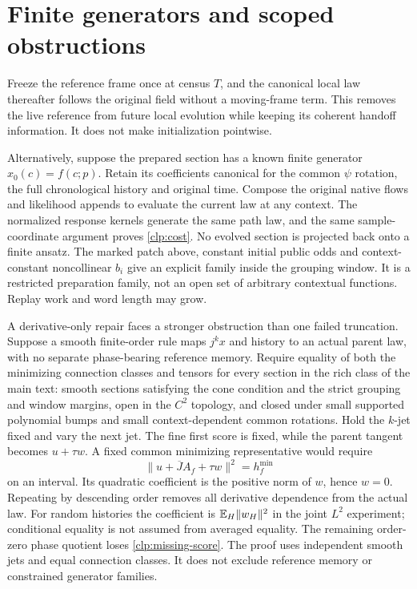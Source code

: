 \section{Finite generators and scoped obstructions}

Freeze the reference frame once at census $T$, and the canonical local law thereafter follows the original field without a moving-frame term. This removes the live reference from future local evolution while keeping its coherent handoff information. It does not make initialization pointwise.

Alternatively, suppose the prepared section has a known finite generator $x_0(c)=f(c;p)$. Retain its coefficients canonical for the common $\psi$ rotation, the full chronological history and original time. Compose the original native flows and likelihood appends to evaluate the current law at any context. The normalized response kernels generate the same path law, and the same sample-coordinate argument proves \cref{clp:cost}. No evolved section is projected back onto a finite ansatz. The marked patch above, constant initial public odds and context-constant noncollinear $b_i$ give an explicit family inside the grouping window. It is a restricted preparation family, not an open set of arbitrary contextual functions. Replay work and word length may grow.

A derivative-only repair faces a stronger obstruction than one failed truncation. Suppose a smooth finite-order rule maps $j^k x$ and history to an actual parent law, with no separate phase-bearing reference memory. Require equality of both the minimizing connection classes and tensors for every section in the rich class of the main text: smooth sections satisfying the cone condition and the strict grouping and window margins, open in the $C^2$ topology, and closed under small supported polynomial bumps and small context-dependent common rotations. Hold the $k$-jet fixed and vary the next jet. The fine first score is fixed, while the parent tangent becomes $u+\tau w$. A fixed common minimizing representative would require
\begin{equation}
 \|u+\overline J A_f+\tau w\|^2=h_f^{\min}
 \label{clp:obstruction}
\end{equation}
on an interval. Its quadratic coefficient is the positive norm of $w$, hence $w=0$. Repeating by descending order removes all derivative dependence from the actual law. For random histories the coefficient is $\mathbb E_H\|w_H\|^2$ in the joint $L^2$ experiment; conditional equality is not assumed from averaged equality. The remaining order-zero phase quotient loses \cref{clp:missing-score}. The proof uses independent smooth jets and equal connection classes. It does not exclude reference memory or constrained generator families.

